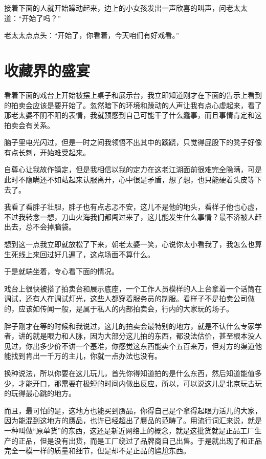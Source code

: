 接着下面的人就开始躁动起来，边上的小女孩发出一声欣喜的叫声，问老太太道：“开始了吗？”

老太太点点头：“开始了，你看着，今天咱们有好戏看。”

\chapter{收藏界的盛宴}

看着下面的戏台上开始被摆上桌子和展示台，我立即知道刚才在下面的告示上看到的拍卖会应该是要开始了。忽然暗下的环境和躁动的人声让我有点心虚起来，看了那老太婆不阴不阳的表情，我就预感到自己可能干了什么蠢事，而且事情肯定和这拍卖会有关系。

脑子里电光闪过，但是一时之间我领悟不出其中的蹊跷，只觉得屁股下的凳子好像有点长刺，开始难受起来。

自尊心让我故作镇定，但是我相信以我的定力在这老江湖面前很难完全隐瞒，可是此时不隐瞒还不如站起来认服离开，心中很是矛盾，想了想，也只能硬着头皮等下去了。

我看了看胖子壮胆，胖子也有点忐忑不安，这儿不是他的地头，看样子他也心虚，不过我转念一想，刀山火海我们都闯过来了，这儿能发生什么事情？最不济被人赶出去，总不会掉脑袋。

想到这一点我立即就放松了下来，朝老太婆一笑，心说你太小看我了，我怎么也算生死线上来回过好几遍了，这点场面不算什么。

于是就端坐着，专心看下面的情况。

戏台上很快被搭了拍卖台和展示底座，一个工作人员模样的人上台拿着一个话筒在调试，还有人在调试灯光，这些人都穿着服务员的制服。看样子不是拍卖公司做的，应该如传闻一般，是属于私人的内部拍卖会，行内的大家玩的场子。

胖子刚才在等的时候和我说过，这儿的拍卖会最特别的地方，就是不认什么专家学者，讲的就是眼力和人脉，因为大部分这儿拍的东西，都没法估价，甚至根本没人见过，你出多少价不讲一个基准，你感觉这东西能卖个五百来万，但对方的渠道他能找到肯出一千万的主儿，你就一点办法也没有。

换种说法，所以你要在这儿玩儿，首先你得知道拍的是什么东西，然后知道能值多少，才能开口，那需要在极短的时间内做出反应，所以，可以说这儿是北京玩古玩的玩得最心跳的地方。

而且，最可怕的是，这地方也能买到赝品，你得自己是个拿得起眼力活儿的大家，因为能混到这地方的赝品，也许已经超出了赝品的范畴了。用流行词汇来说，就是一种叫做“原单货”的东西，这还是新近网络上的概念，就是这批货就是正品工厂生产的正品，但是没有出货，而是工厂绕过了品牌商自己出售。于是就出现了和正品完全一模一样的质量和细节，但是却不是正品的尴尬东西。

